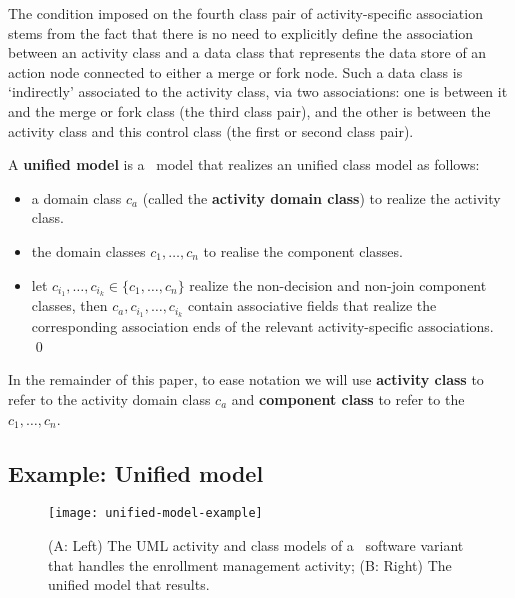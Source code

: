 The condition imposed on the fourth class pair of activity-specific association stems from the fact that there is no need to explicitly define the association between an activity class and a data class that represents the data store of an action node connected to either a merge or fork node. Such a data class is `indirectly' associated to the activity class, via two associations: one is between it and the merge or fork class (the third class pair), and the other is between the activity class and this control class (the first or second class pair).

\begin{definition} \label{def:unified-model}
	A \textbf{unified model} is a \dcsl~model that realizes an unified class model as follows:
	\begin{itemize}%
		\item a domain class $ c_a $ (called the \textbf{activity domain class}) to realize the activity class.
		\item the domain classes $ c_1,\dots,c_n $ to realise the component classes.
		\item let $ c_{i_1},\dots,c_{i_k} \in \{c_1,\dots,c_n\} $ realize the non-decision and non-join component classes, then $ c_a,c_{i_1},\dots,c_{i_k} $ contain associative fields that realize the corresponding association ends of the relevant activity-specific associations. \qed
	\end{itemize}
\end{definition}

In the remainder of this paper, to ease notation we will use \textbf{activity class} to refer to the activity domain class $ c_a $ and \textbf{component class} to refer to the $ c_1,\dots,c_n $. 
%
\subsection*{Example: Unified model}
%
\begin{figure*}[ht]
	\begin{center}
		\texttt{[image: unified-model-example]}
	\end{center}
	\caption{(A: Left) The UML activity and class models of a \courseman~software variant that handles the enrollment management activity; (B: Right) The unified model that results.} %
	\label{fig:unified-model-example}
\end{figure*} 

